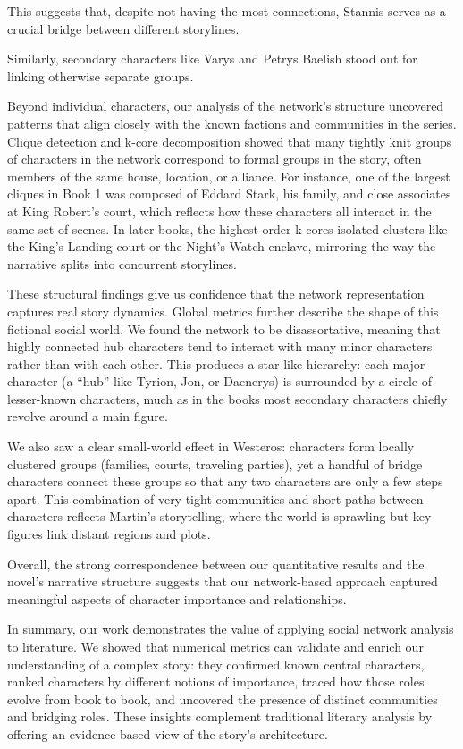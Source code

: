 \documentclass[12pt, a4paper]{article}
\begin{document}
This suggests that, despite not  having the most connections, Stannis serves as a crucial bridge between different storylines.

Similarly, secondary characters like Varys and Petrys Baelish stood out for linking otherwise separate groups.



Beyond individual characters, our analysis of the network’s structure uncovered patterns that align closely with the known factions and communities in the series. 
Clique detection and k-core decomposition showed that many tightly knit groups of characters in the network correspond to formal groups in the story,
 often members of the same house, location, or alliance. 
 For instance, one of the largest cliques in Book 1 was composed of Eddard Stark, his family, and close associates at King Robert’s court, 
 which reflects how these characters all interact in the same set of scenes. 
 In later books, the highest-order k-cores isolated clusters like the King’s Landing court or the Night’s Watch enclave, 
 mirroring the way the narrative splits into concurrent storylines. 

 These structural findings give us confidence that the network representation captures real story dynamics. 
 Global metrics further describe the shape of this fictional social world. 
 We found the network to be disassortative, meaning that highly connected hub characters tend to interact with many minor characters rather than with each other. 
 This produces a star-like hierarchy: each major character (a “hub” like Tyrion, Jon, or Daenerys) is surrounded by a circle of lesser-known characters, 
 much as in the books most secondary characters chiefly revolve around a main figure. 

 We also saw a clear small-world effect in Westeros: characters form locally clustered groups 
 (families, courts, traveling parties), yet a handful of bridge characters connect these groups so that any two characters are only a few steps apart. 
 This combination of very tight communities and short paths between characters reflects Martin’s storytelling, 
 where the world is sprawling but key figures link distant regions and plots. 
 
 Overall, the strong correspondence between our quantitative results and the novel’s narrative structure suggests that 
 our network-based approach captured meaningful aspects of character importance and relationships.

In summary, our work demonstrates the value of applying social network analysis to literature. We showed that numerical metrics can validate 
and enrich our understanding of a complex story: 
they confirmed known central characters, ranked characters by different notions of importance, 
traced how those roles evolve from book to book, and uncovered the presence of distinct communities and bridging roles. 
These insights complement traditional literary analysis by offering an evidence-based view of the story’s architecture. 
\end{document}
